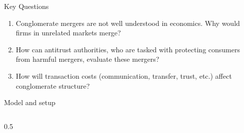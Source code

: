\documentclass[aspectratio=169]{beamer}
\begin{document}
\begin{frame}{Key Questions}
  
  \begin{enumerate}
    \setlength\itemsep{0.8em}
    \item Conglomerate mergers are not well understood in economics. Why would firms in unrelated markets merge?
    \item How can antitrust authorities, who are tasked with protecting consumers from harmful mergers, evaluate these mergers?
    \item How will transaction costs (communication, transfer, trust, etc.) affect conglomerate structure?
  \end{enumerate}

\end{frame}


\begin{frame}{Model and setup}
  \begin{columns}[T]
    \begin{column}{0.5\textwidth}
      \begin{minipage}{\linewidth}
        \begin{algorithm}[H]
          \SetAlgoLined
\end{algorithm}
\end{minipage}
\end{column}
\end{columns}
\end{frame}
\end{document}
